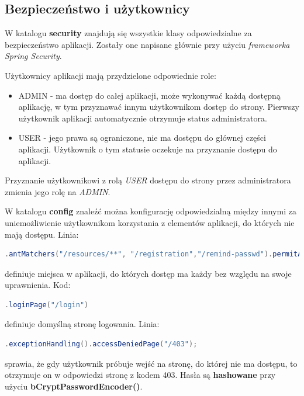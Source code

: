 \documentclass[11pt]{article}
\begin{document}
\subsection{Bezpieczeństwo i użytkownicy}

W katalogu \textbf{security} znajdują się wszystkie klasy odpowiedzialne za bezpieczeństwo aplikacji. Zostały one napisane głównie przy użyciu \emph{frameworka Spring Security}.

Użytkownicy aplikacji mają przydzielone odpowiednie role:
\begin{itemize}
\item ADMIN - ma dostęp do całej aplikacji, może wykonywać każdą dostępną aplikację, w tym przyznawać innym użytkownikom dostęp do strony. Pierwszy użytkownik aplikacji automatycznie otrzymuje status administratora.
\item USER - jego prawa są ograniczone, nie ma dostępu do głównej części aplikacji. Użytkownik o tym statusie oczekuje na przyznanie dostępu do aplikacji.
\end{itemize} 
Przyznanie użytkownikowi z rolą \emph{USER} dostępu do strony przez administratora zmienia jego rolę na \emph{ADMIN}.

W katalogu \textbf{config} znaleźć można konfigurację odpowiedzialną między innymi za uniemożliwienie użytkownikom korzystania z elementów aplikacji, do których nie mają dostępu. \newline
Linia:
\begin{lstlisting}[language=java]
.antMatchers("/resources/**", "/registration","/remind-passwd").permitAll()
\end{lstlisting}
definiuje miejsca w aplikacji, do których dostęp ma każdy bez względu na swoje uprawnienia. \newline
Kod:
\begin{lstlisting}[language=java]
.loginPage("/login")
\end{lstlisting}
definiuje domyślną stronę logowania. \newline
Linia:
\begin{lstlisting}[language=java]
.exceptionHandling().accessDeniedPage("/403");
\end{lstlisting}
sprawia, że gdy użytkownik próbuje wejść na stronę, do której nie ma dostępu, to otrzymuje on w odpowiedzi stronę z kodem 403. \newline
Hasła są \textbf{hashowane} przy użyciu \textbf{bCryptPasswordEncoder()}.
\end{document}
